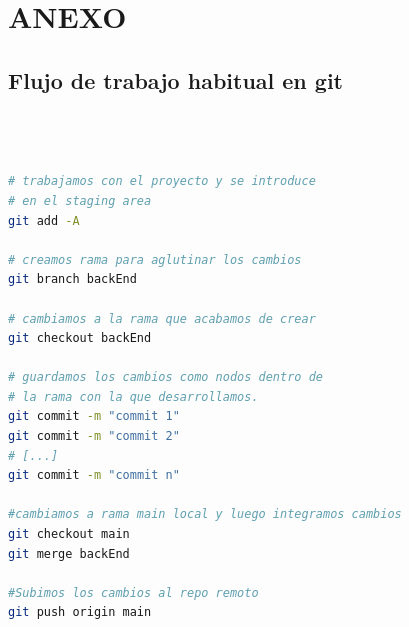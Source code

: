 \documentclass[a4paper,12pt]{report}
\begin{document}
	
	
	
	

	
	
	
	
	
	
	
	
	
	
	
	
	
	
	
	
	
	
	
	
	
	
	
	
	
	
	
	
	
	
	
	
	
	
	
	
	
	
	
	
	\chapter{ANEXO}
	\label{chap:anexo} %
		
			
		\section{Flujo de trabajo habitual en git}
		\label{sec:anexoFlujoGit}
		
\begin{lstlisting}[language=bash, basicstyle=\ttfamily\small]
	


# trabajamos con el proyecto y se introduce
# en el staging area
git add -A 

# creamos rama para aglutinar los cambios
git branch backEnd

# cambiamos a la rama que acabamos de crear
git checkout backEnd

# guardamos los cambios como nodos dentro de
# la rama con la que desarrollamos.	
git commit -m "commit 1"  	
git commit -m "commit 2"
# [...]
git commit -m "commit n"

#cambiamos a rama main local y luego integramos cambios
git checkout main
git merge backEnd

#Subimos los cambios al repo remoto
git push origin main 

	
\end{lstlisting}
		
	
\pagebreak
\end{document}
